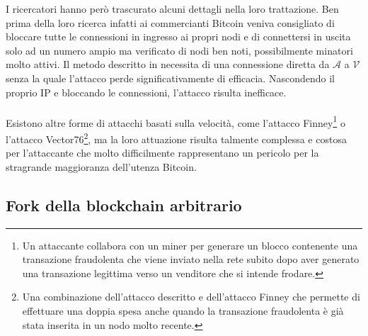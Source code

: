 I ricercatori hanno però trascurato alcuni dettagli nella loro trattazione. Ben prima della loro ricerca infatti ai commercianti Bitcoin veniva consigliato di bloccare tutte le connessioni in ingresso ai propri nodi e di connettersi in uscita solo ad un numero ampio ma verificato di nodi ben noti, possibilmente minatori molto attivi. Il metodo descritto in \cite{doublespendig_fast} necessita di una connessione diretta da $\mathcal{A}$ a $\mathcal{V}$ senza la quale l'attacco perde significativamente di efficacia. Nascondendo il proprio IP e bloccando le connessioni, l'attacco risulta inefficace.\\\\
Esistono altre forme di attacchi basati sulla velocità, come l'attacco Finney\footnote{Un attaccante collabora con un miner per generare un blocco contenente una transazione fraudolenta che viene inviato nella rete subito dopo aver generato una transazione legittima verso un venditore che si intende frodare.} o l'attacco Vector76\footnote{Una combinazione dell'attacco descritto e dell'attacco Finney che permette di effettuare una doppia spesa anche quando la transazione fraudolenta è già stata inserita in un nodo molto recente.}, ma la loro attuazione risulta talmente complessa e costosa per l'attaccante che molto difficilmente rappresentano un pericolo per la stragrande maggioranza dell'utenza Bitcoin.

\subsection{Fork della blockchain arbitrario}\label{attacchi-hashrate}

